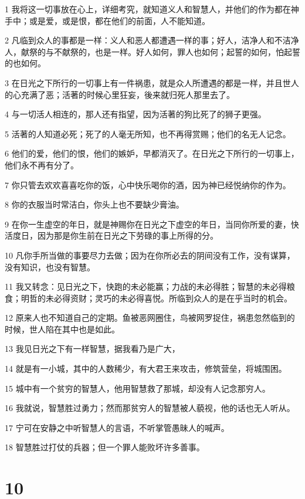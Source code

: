 \par 1 我将这一切事放在心上，详细考究，就知道义人和智慧人，并他们的作为都在神手中；或是爱，或是恨，都在他们的前面，人不能知道。
\par 2 凡临到众人的事都是一样：义人和恶人都遭遇一样的事；好人，洁净人和不洁净人，献祭的与不献祭的，也是一样。好人如何，罪人也如何；起誓的如何，怕起誓的也如何。
\par 3 在日光之下所行的一切事上有一件祸患，就是众人所遭遇的都是一样，并且世人的心充满了恶；活著的时候心里狂妄，後来就归死人那里去了。
\par 4 与一切活人相连的，那人还有指望，因为活著的狗比死了的狮子更强。
\par 5 活著的人知道必死；死了的人毫无所知，也不再得赏赐；他们的名无人记念。
\par 6 他们的爱，他们的恨，他们的嫉妒，早都消灭了。在日光之下所行的一切事上，他们永不再有分了。
\par 7 你只管去欢欢喜喜吃你的饭，心中快乐喝你的酒，因为神已经悦纳你的作为。
\par 8 你的衣服当时常洁白，你头上也不要缺少膏油。
\par 9 在你一生虚空的年日，就是神赐你在日光之下虚空的年日，当同你所爱的妻，快活度日，因为那是你生前在日光之下劳碌的事上所得的分。
\par 10 凡你手所当做的事要尽力去做；因为在你所必去的阴间没有工作，没有谋算，没有知识，也没有智慧。
\par 11 我又转念：见日光之下，快跑的未必能赢；力战的未必得胜；智慧的未必得粮食；明哲的未必得资财；灵巧的未必得喜悦。所临到众人的是在乎当时的机会。
\par 12 原来人也不知道自己的定期。鱼被恶网圈住，鸟被网罗捉住，祸患忽然临到的时候，世人陷在其中也是如此。
\par 13 我见日光之下有一样智慧，据我看乃是广大，
\par 14 就是有一小城，其中的人数稀少，有大君王来攻击，修筑营垒，将城围困。
\par 15 城中有一个贫穷的智慧人，他用智慧救了那城，却没有人记念那穷人。
\par 16 我就说，智慧胜过勇力；然而那贫穷人的智慧被人藐视，他的话也无人听从。
\par 17 宁可在安静之中听智慧人的言语，不听掌管愚昧人的喊声。
\par 18 智慧胜过打仗的兵器；但一个罪人能败坏许多善事。

\chapter{10}

